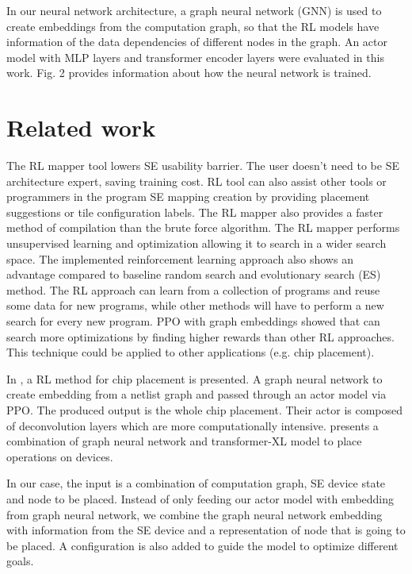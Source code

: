 \documentclass[sigplan,screen]{acmart}
\begin{document}
In our neural network architecture, a graph neural network (GNN) is used to create embeddings from the computation graph, so that the RL models have information of the data dependencies of different nodes in the graph. 
An actor model with MLP layers and transformer encoder layers were evaluated in this work. Fig. 2 provides information about how the neural network is trained. 

\section{Related work}

The RL mapper tool lowers SE usability barrier. 
The user doesn’t need to be SE architecture expert, saving training cost. RL tool can also assist other tools or programmers in the program SE mapping creation by providing placement suggestions or tile configuration labels. 
The RL mapper also provides a faster method of compilation than the brute force algorithm. 
The RL mapper performs unsupervised learning and optimization allowing it to search in a wider search space. 
The implemented reinforcement learning approach also shows an advantage compared to baseline random search and evolutionary search (ES) method. 
The RL approach can learn from a collection of programs and reuse some data for new programs, while other methods will have to perform a new search for every new program. 
PPO with graph embeddings showed that can search more optimizations by finding higher rewards than other RL approaches. 
This technique could be applied to other applications (e.g. chip placement). 

In \cite{mirhoseini2020chip}, a RL method for chip placement is presented. 
A graph neural network to create embedding from a netlist graph and passed through an actor model via PPO. 
The produced output is the whole chip placement. 
Their actor is composed of deconvolution layers which are more computationally intensive. 
\cite{zhou2019gdp} presents a combination of graph neural network and transformer-XL model to place operations on devices. 

In our case, the input is a combination of computation graph, SE device state and node to be placed. 
Instead of only feeding our actor model with embedding from graph neural network, we combine the graph neural network embedding with information from the SE device and a representation of node that is going to be placed. 
A configuration is also added to guide the model to optimize different goals.  
\end{document}
